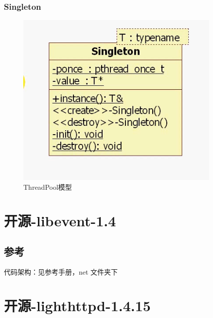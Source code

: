 \documentclass[UTF8,a4paper,8pt]{ctexbook}
\begin{document}
		\subsection{Singleton}	
				\begin{figure}[htbp]
					\centering
					\includegraphics[scale= 0.4]{figure/muduoSingleton.png}
					\caption{ThreadPool模型}
				\end{figure}
\chapter{开源-libevent-1.4}
	\section{参考}
		代码架构：见参考手册，net 文件夹下
	
\chapter{开源-lighthttpd-1.4.15}
\end{document}
